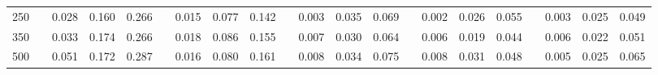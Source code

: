 % 
\begin{tabular}{ccccccccccccccccccccc}
  \hline
  \hline
250 &  & 0.028 & 0.160 & 0.266 &  & 0.015 & 0.077 & 0.142 &  & 0.003 & 0.035 & 0.069 &  & 0.002 & 0.026 & 0.055 &  & 0.003 & 0.025 & 0.049 \\ 
  350 &  & 0.033 & 0.174 & 0.266 &  & 0.018 & 0.086 & 0.155 &  & 0.007 & 0.030 & 0.064 &  & 0.006 & 0.019 & 0.044 &  & 0.006 & 0.022 & 0.051 \\ 
  500 &  & 0.051 & 0.172 & 0.287 &  & 0.016 & 0.080 & 0.161 &  & 0.008 & 0.034 & 0.075 &  & 0.008 & 0.031 & 0.048 &  & 0.005 & 0.025 & 0.065 \\ 
   \hline
\end{tabular}
